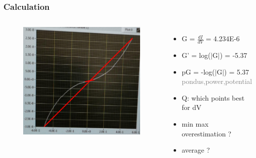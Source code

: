 \documentclass{beamer}
\newcommand{\me}[1]{\textcolor{gray}{#1}}
\begin{document}
\begin{frame}
	\frametitle[center]{Calculation}
	\begin{columns}[t]
		\begin{figure}
			\includegraphics[width=.9\textwidth]{pics/iv_grad.png}
		\end{figure}
	\begin{itemize}
		\item G = $\frac{dI}{dV}$ = 4.234E-6
		\item G' = log($|$G$|$) = -5.37
		\item pG = -log($|$G$|$) = 5.37 \me{pondus,power,potential}
		\item Q: which points best for dV
		\item min max overestimation ? 
		\item average ?
	\end{itemize}
	\end{columns}
\end{frame}
\end{document}
